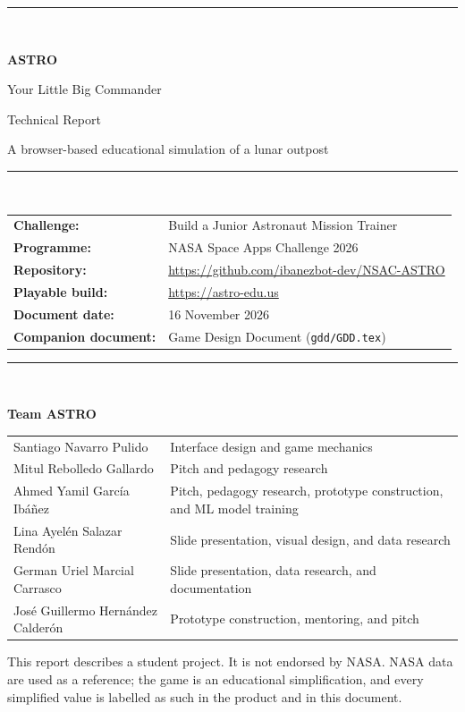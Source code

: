 \documentclass[11pt,a4paper]{article}
\newcommand{\code}[1]{\texttt{#1}}
\begin{document}
\begin{titlepage}
  \centering
  \vspace*{1.2cm}
  {\color{astroblue}\rule{\linewidth}{2pt}}\\[0.8cm]
  {\Huge\bfseries ASTRO\par}
  \vspace{0.3cm}
  {\LARGE Your Little Big Commander\par}
  \vspace{1.0cm}
  {\Large Technical Report\par}
  \vspace{0.4cm}
  {\large A browser-based educational simulation of a lunar outpost\par}
  \vspace{1.2cm}
  {\color{astroblue}\rule{\linewidth}{0.8pt}}\\[1.0cm]

  \begin{tabular}{@{}ll@{}}
    \textbf{Challenge:} & Build a Junior Astronaut Mission Trainer\\
    \textbf{Programme:} & NASA Space Apps Challenge 2026\\
    \textbf{Repository:} & \url{https://github.com/ibanezbot-dev/NSAC-ASTRO}\\
    \textbf{Playable build:} & \url{https://astro-edu.us}\\
    \textbf{Document date:} & 16 November 2026\\
    \textbf{Companion document:} & Game Design Document (\code{gdd/GDD.tex})\\
  \end{tabular}

  \vspace{0.9cm}
  {\color{astroblue}\rule{0.8\linewidth}{0.4pt}}\\[0.4cm]
  {\large\bfseries Team ASTRO\par}
  \vspace{0.3cm}
  {\small
  \begin{tabular}{@{}p{4.8cm}p{9.0cm}@{}}
    Santiago Navarro Pulido & Interface design and game mechanics\\
    Mitul Rebolledo Gallardo & Pitch and pedagogy research\\
    Ahmed Yamil Garc\'ia Ib\'a\~nez & Pitch, pedagogy research, prototype construction, and ML model training\\
    Lina Ayel\'en Salazar Rend\'on & Slide presentation, visual design, and data research\\
    German Uriel Marcial Carrasco & Slide presentation, data research, and documentation\\
    Jos\'e Guillermo Hern\'andez Calder\'on & Prototype construction, mentoring, and pitch\\
  \end{tabular}\par}

  \vfill
  {\small This report describes a student project. It is not endorsed by NASA. NASA data are used as a reference; the game is an educational simplification, and every simplified value is labelled as such in the product and in this document.}
\end{titlepage}
\end{document}
